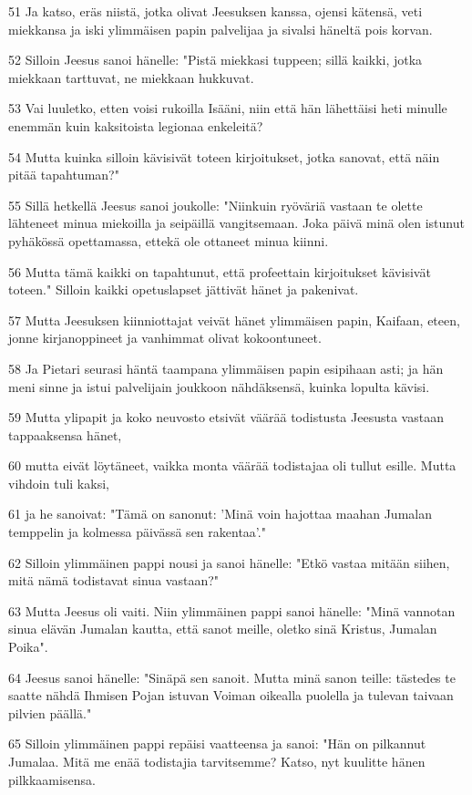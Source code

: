 \par 51 Ja katso, eräs niistä, jotka olivat Jeesuksen kanssa, ojensi kätensä, veti miekkansa ja iski ylimmäisen papin palvelijaa ja sivalsi häneltä pois korvan.
\par 52 Silloin Jeesus sanoi hänelle: "Pistä miekkasi tuppeen; sillä kaikki, jotka miekkaan tarttuvat, ne miekkaan hukkuvat.
\par 53 Vai luuletko, etten voisi rukoilla Isääni, niin että hän lähettäisi heti minulle enemmän kuin kaksitoista legionaa enkeleitä?
\par 54 Mutta kuinka silloin kävisivät toteen kirjoitukset, jotka sanovat, että näin pitää tapahtuman?"
\par 55 Sillä hetkellä Jeesus sanoi joukolle: "Niinkuin ryöväriä vastaan te olette lähteneet minua miekoilla ja seipäillä vangitsemaan. Joka päivä minä olen istunut pyhäkössä opettamassa, ettekä ole ottaneet minua kiinni.
\par 56 Mutta tämä kaikki on tapahtunut, että profeettain kirjoitukset kävisivät toteen." Silloin kaikki opetuslapset jättivät hänet ja pakenivat.
\par 57 Mutta Jeesuksen kiinniottajat veivät hänet ylimmäisen papin, Kaifaan, eteen, jonne kirjanoppineet ja vanhimmat olivat kokoontuneet.
\par 58 Ja Pietari seurasi häntä taampana ylimmäisen papin esipihaan asti; ja hän meni sinne ja istui palvelijain joukkoon nähdäksensä, kuinka lopulta kävisi.
\par 59 Mutta ylipapit ja koko neuvosto etsivät väärää todistusta Jeesusta vastaan tappaaksensa hänet,
\par 60 mutta eivät löytäneet, vaikka monta väärää todistajaa oli tullut esille. Mutta vihdoin tuli kaksi,
\par 61 ja he sanoivat: "Tämä on sanonut: 'Minä voin hajottaa maahan Jumalan temppelin ja kolmessa päivässä sen rakentaa'."
\par 62 Silloin ylimmäinen pappi nousi ja sanoi hänelle: "Etkö vastaa mitään siihen, mitä nämä todistavat sinua vastaan?"
\par 63 Mutta Jeesus oli vaiti. Niin ylimmäinen pappi sanoi hänelle: "Minä vannotan sinua elävän Jumalan kautta, että sanot meille, oletko sinä Kristus, Jumalan Poika".
\par 64 Jeesus sanoi hänelle: "Sinäpä sen sanoit. Mutta minä sanon teille: tästedes te saatte nähdä Ihmisen Pojan istuvan Voiman oikealla puolella ja tulevan taivaan pilvien päällä."
\par 65 Silloin ylimmäinen pappi repäisi vaatteensa ja sanoi: "Hän on pilkannut Jumalaa. Mitä me enää todistajia tarvitsemme? Katso, nyt kuulitte hänen pilkkaamisensa.
